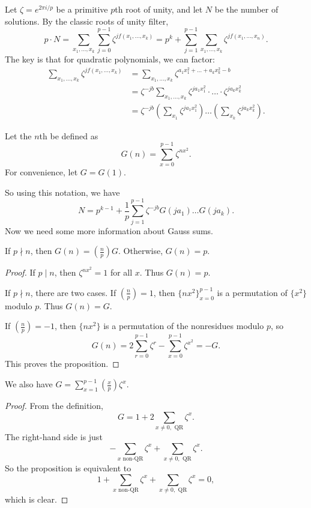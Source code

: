 \documentclass{scrartcl}
\begin{document}
Let $\zeta=e^{2\pi i/p}$ be a primitive $p$th root of unity, and 
let $N$ be the number of solutions. 
By the classic roots of unity filter,
$$p\cdot N = \sum_{x_1, \dots, x_k}\sum_{j=0}^{p-1} \zeta^{j f(x_1, \dots, x_k)} = 
p^{k}+\sum_{j=1}^{p-1}\sum_{x_1, \dots, x_k}\zeta^{j f(x_1, \dots, x_n)}.$$
The key is that for quadratic polynomials, we can factor:
\begin{align*}
	\sum_{x_1, \dots, x_k} \zeta^{j f(x_1, \dots, x_k)} &= \sum_{x_1, \dots, x_k} \zeta^{a_1x_1^2+\dots+a_kx_k^2-b} \\
	&= \zeta^{-jb} \sum_{x_1, \dots, x_k} \zeta^{ja_1x_1^2}\cdot \ldots \cdot \zeta^{ja_kx_k^2} \\
	&= \zeta^{-jb}\left(\sum_{x_1}\zeta^{ja_1x_1^2}\right)\ldots \left(\sum_{x_k}\zeta^{ja_kx_k^2}\right).
\end{align*}

\begin{definition}
	Let the $n$th  be defined as $$G(n)=\sum_{x=0}^{p-1} \zeta^{nx^2}.$$
	For convenience, let $G=G(1)$.
\end{definition}

So using this notation, we have
$$N=p^{k-1}+\frac{1}{p}\sum_{j=1}^{p-1} \zeta^{-jb}G(ja_1)\dots G(ja_k).$$
Now we need some more information about Gauss sums.

\begin{proposition}
	If $p\nmid n$, then $G(n)=(\tfrac{n}{p})G$. Otherwise, $G(n)=p$.
\end{proposition}

\begin{proof}
	If $p\mid n$, then $\zeta^{nx^2}=1$ for all $x$. Thus $G(n)=p$.

	If $p\nmid n$, there are two cases. If $(\tfrac np)=1$, 
	then $\{nx^2\}_{x=0}^{p-1}$ is a permutation of $\{x^2\}$ modulo $p$. Thus $G(n)=G$.

	If $(\tfrac np)=-1$, then $\{nx^2\}$ is a permutation of the nonresidues modulo $p$, so
	$$G(n)=2\sum_{r=0}^{p-1}\zeta^r - \sum_{x=0}^{p-1}\zeta^{x^2} = -G.$$
	This proves the proposition.
\end{proof}

\begin{proposition}
	We also have $G = \sum_{x=1}^{p-1}\left(\frac xp \right)\zeta^x$.
\end{proposition}

\begin{proof} 
	From the definition, 
	$$G=1+2\sum_{x\neq 0, \text{ QR}} \zeta^x.$$
	The right-hand side is just
	 $$-\sum_{x \text{ non-QR}}\zeta^x + \sum_{x\neq 0, \text { QR}} \zeta^x.$$
	 So the proposition is equivalent to 
	 $$1+\sum_{x \text{ non-QR}}\zeta^x+\sum_{x\neq 0, \text { QR}}\zeta^x=0,$$
	 which is clear.
\end{proof}
\end{document}
